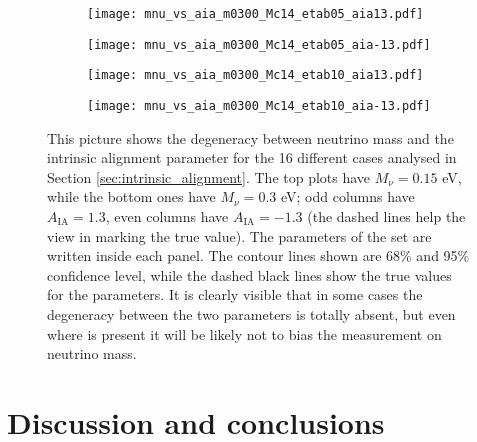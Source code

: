 \documentclass[a4paper,11pt]{article}
\begin{document}
\begin{figure}[!t]
        \begin{subfigure}[b]{0.25\textwidth}
            \centering
            \texttt{[image: mnu\_vs\_aia\_m0300\_Mc14\_etab05\_aia13.pdf]}
        \end{subfigure}
        \hspace{-.7\baselineskip}
        \begin{subfigure}[b]{0.25\textwidth}  
            \centering 
            \texttt{[image: mnu\_vs\_aia\_m0300\_Mc14\_etab05\_aia-13.pdf]}
        \end{subfigure}
        \hspace{-.7\baselineskip}
        \begin{subfigure}[b]{0.25\textwidth}
            \centering
            \texttt{[image: mnu\_vs\_aia\_m0300\_Mc14\_etab10\_aia13.pdf]}
        \end{subfigure}
        \hspace{-.7\baselineskip}
        \begin{subfigure}[b]{0.25\textwidth}  
            \centering 
            \texttt{[image: mnu\_vs\_aia\_m0300\_Mc14\_etab10\_aia-13.pdf]}
        \end{subfigure}
        \vspace{\baselineskip}
        \caption{This picture shows the degeneracy between neutrino mass and the intrinsic alignment parameter for the 16 different cases analysed in Section \ref{sec:intrinsic_alignment}.
The top plots have $M_\nu = 0.15$ eV, while the bottom ones have $M_\nu = 0.3$ eV; odd columns have $A_\mathrm{IA} = 1.3$, even columns have $A_\mathrm{IA} = -1.3$ (the dashed lines help the view in marking the true value). The parameters of the set are written inside each panel.
The contour lines shown are 68\% and 95\% confidence level, while the dashed black lines show the true values for the parameters. It is clearly visible that in some cases the degeneracy between the two parameters is totally absent, but even where is present it will be likely not to bias the measurement on neutrino mass.}
        \label{fig:Mnu_vs_AIA}
\end{figure}


\section{Discussion and conclusions}
\label{sec:discussion}
\end{document}
